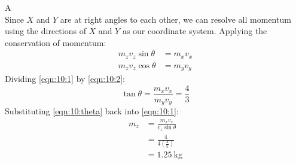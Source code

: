 \documentclass[answers]{exam}
\begin{document}
\begin{questions}
{\begin{choices}
				\end{choices}
			\begin{solution} A \\
			Since $X$ and $Y$ are at right angles to each other, we can resolve all momentum using the directions of $X$ and $Y$ as our coordinate system. Applying the conservation of momentum:
			\begin{align}
				m_zv_z \sin \theta &= m_xv_x \label{eqn:10:1}\\
				m_zv_z \cos \theta &= m_yv_y \label{eqn:10:2}
			\end{align}
			Dividing \eqref{eqn:10:1} by \eqref{eqn:10:2}:
			\begin{equation}
				\tan \theta = \frac{m_xv_x}{m_yv_y} = \frac{4}{3} \label{eqn:10:theta}
			\end{equation}
			Substituting \eqref{eqn:10:theta} back into \eqref{eqn:10:1}:
			\begin{align*}
				m_z &= \frac{m_xv_x}{v_z \sin\theta} \\
				&= \frac{4}{4\left(\frac{4}{5}\right)} \\
				&= \SI{1.25}{\kilogram}
			\end{align*}
			\end{solution}
			}
		
		\end{questions}
	\pagebreak
\end{document}
